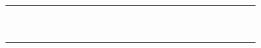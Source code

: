 \documentclass[12pt,a4paper]{article}
\begin{document}
\begin{landscape}
\begin{table}[ht!]
\begin{tabular}{|l|l|l|l|l|l|l|l|l|l|l|l|l|l|l|l|l|l|l|l|l|l|l|l|l|l|}
			                               &                                          &    &    &    &    &    &    &    &    &     &     &     &     &     &     &     &     &     &     &     &           \\\hline
			                               &                                          &    &    &    &    &    &    &    &    &     &     &     &     &     &     &     &     &     &     &     &           \\\hline
			                               &                                          &    &    &    &    &    &    &    &    &     &     &     &     &     &     &     &     &     &     &     &           \\\hline
			                               &                                          &    &    &    &    &    &    &    &    &     &     &     &     &     &     &     &     &     &     &     &           \\\hline
			                               &                                          &    &    &    &    &    &    &    &    &     &     &     &     &     &     &     &     &     &     &     &           \\\hline
			                               &                                          &    &    &    &    &    &    &    &    &     &     &     &     &     &     &     &     &     &     &     &           \\\hline
			                               &                                          &    &    &    &    &    &    &    &    &     &     &     &     &     &     &     &     &     &     &     &           \\\hline
			                               &                                          &    &    &    &    &    &    &    &    &     &     &     &     &     &     &     &     &     &     &     &           \\\hline
			                               &                                          &    &    &    &    &    &    &    &    &     &     &     &     &     &     &     &     &     &     &     &           \\\hline
			                               &                                          &    &    &    &    &    &    &    &    &     &     &     &     &     &     &     &     &     &     &     &           \\\hline
			                               &                                          &    &    &    &    &    &    &    &    &     &     &     &     &     &     &     &     &     &     &     &           \\\hline

\end{tabular}
\end{table}
\end{landscape}
\end{document}
